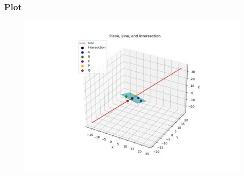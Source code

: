 \documentclass{beamer}
\begin{document}
\begin{frame}[fragile]
    \frametitle{Plot}

\begin{figure}[H]
    \centering
    \includegraphics[scale=0.5]{figs/4.4.12.jpg}
    \caption{}
    \label{fig:1}
\end{figure}


 
\end{frame}
\end{document}
